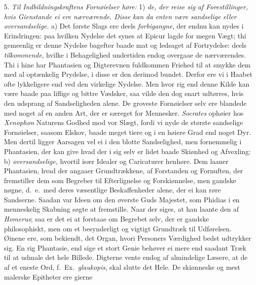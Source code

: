 \documentclass[12pt,a4paper]{article}
\newcommand{\opage}[1]{\marginnote{\footnotesize\textit{[#1]}}}
\begin{document}
5. \emph{Til Indbildningskraftens Fornøielser høre:} 1) \emph{de, der reise sig af
Forestillinger, hvis Gienstande ei ere nærværende. Disse kan da enten være sandselige eller
oversandselige.} a) Det første Slags ere deels \emph{forbigangne}, der endnu kan nydes i
Erindringen: paa hvilken Nydelse det synes at Epicur lagde for megen Vægt; thi gemeenlig er
denne Nydelse bagefter baade mat og ledsaget af Fortrydelse: deels \emph{tilkommende},
hvilke i Behagelighed undertiden endog overgaae de nærværendes. Thi i hine har Phantasien og
Digterevnen fuldkommen Friehed til at smykke dem med al optænkelig Prydelse, i disse er den
derimod bundet. Derfor ere vi i Haabet ofte lykkeligere end ved den virkelige Nydelse. Men
hvor rig end denne Kilde kan være baade paa liflige og bittre Vædsker, saa vilde den dog
snart udtørres, hvis den udsprang af Sandseligheden alene. De groveste Fornøielser selv ere
blandede
\opage{237} med noget af en anden Art, der er særeget for Mennesker. \emph{Socrates} ophøier hos
\emph{Xenophon} Naturens Godhed mod vor Slægt, fordi vi nyde de største sandselige
Fornøielser, saasom Elskov, baade meget tiere og i en høiere Grad end noget Dyr. Men dertil
ligger Aarsagen vel ei i den blotte Sandselighed, men fornemmelig i Phantasien, der kan
give hvad der i sig selv er lidet baade Skiønhed og Afvexling: b) \emph{oversandselige,}
hvortil især Idealer og Caricaturer henhøre. Dem laaner Phantasien, hvad der angaaer
Grundtrækkene, af Forstanden og Fornuften, der fremstiller dem som Begreber til
Efterlignelse og Forskiønnelse, men gandske nøgne, d.~e.\ med deres væsentlige
Beskaffenheder alene, der ei kan røre Sandserne. Saadan var Ideen om den øverste Guds
Majestet, som Phidias i en menneskelig Skabning søgte at fremstille. Naar der siges, at han
laante den af \emph{Homerus}; saa er det ei at forstaae om Begrebet selv, der er gandske
philosophiskt, men om et besynderligt og vigtigt Grundtræk til Udførelsen. Øinene ere, som
bekiendt, det Organ, hvori Personers Værdighed bedst udtrykker sig. En rig Phantasie, end
sige et stort Genie behøver ei mere end saadant Træk til at udmale det hele Billede.
Digterne vente endog af almindelige Læsere, at de af et eneste Ord, f.~Ex.\
\emph{glaukopis}, skal slutte det Hele. De skiønneske og mest malerske Epitheter ere gierne
\end{document}
